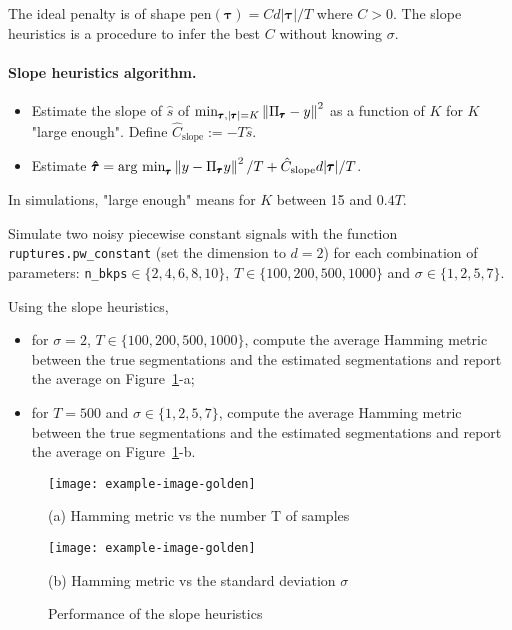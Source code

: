 \documentclass[11pt]{article}
\begin{document}
\newpage
\begin{exercise}[subtitle=Slope heuristics]
The ideal penalty is of shape $\text{pen} (\pmb{\tau}) = Cd|\pmb{\tau}|/T$ where $C>0$. The slope heuristics is a procedure to infer the best $C$ without knowing $\sigma$.

\paragraph{Slope heuristics algorithm.}
\begin{itemize}
    \item Estimate the slope of $\hat{s}$ of $\min_{\pmb{\tau}, |\pmb{\tau}|=K}\left\lVert\Pi_{\pmb{\tau}}-y\right\rVert^2$ as a function of $K$ for $K$ "large enough". Define $\hat{C}_{\text{slope}} := -T\hat{s}$.
    \item Estimate $\pmb{\hat{\tau}} = \operatorname*{\mbox{arg min}}_{\pmb{\tau}} \left\lVert y - \Pi_{\pmb{\tau}}y\right\rVert^2/T + \hat{C}_{\text{slope}} d|\pmb{\tau}|/T$.
\end{itemize}
In simulations, "large enough" means for $K$ between 15 and $0.4T$.

Simulate two noisy piecewise constant signals with the function \texttt{ruptures.pw\_constant} (set the dimension to $d=2$) for each combination of parameters: \texttt{n\_bkps}$\in\{2, 4, 6, 8, 10\}$, $T\in \{100, 200, 500, 1000\}$ and $\sigma\in \{1, 2, 5, 7\}$.

Using the slope heuristics,
\begin{itemize}
    \item for $\sigma = 2$, $T\in \{100, 200, 500, 1000\}$, compute the average Hamming metric between the true segmentations and the estimated segmentations and report the average on Figure~\ref{fig:simulation-slope}-a;
    \item for $T = 500$ and $\sigma\in \{1, 2, 5, 7\}$, compute the average Hamming metric between the true segmentations and the estimated segmentations and report the average on Figure~\ref{fig:simulation-slope}-b.
\end{itemize}

\end{exercise}

\begin{solution}
\begin{figure}
    \centering
    \begin{minipage}[t]{0.45\textwidth}
    \centerline{\texttt{[image: example-image-golden]}}
    \centerline{(a) Hamming metric vs the number T of samples}
    \end{minipage}
    \hfill
    \begin{minipage}[t]{0.45\textwidth}    \centerline{\texttt{[image: example-image-golden]}}
    \centerline{(b) Hamming metric vs the standard deviation $\sigma$}
    \end{minipage}
    \caption{Performance of the slope heuristics}\label{fig:simulation-slope}
\end{figure}
\end{solution}
\end{document}

